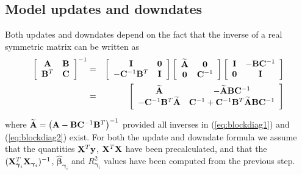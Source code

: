 \documentclass[12pt]{article}
\def\vectorfontone{\bf}
\def\vectorfonttwo{\boldsymbol}
\def\vy{{\vectorfontone y}}                      %
\def\vzero{{\vectorfontone 0}}
\def\vbeta{{\vectorfonttwo \beta}}               %
\def\vgamma{{\vectorfonttwo \gamma}}             %
\def\matrixfontone{\bf}
\def\mA{{\matrixfontone A}}                      %
\def\mB{{\matrixfontone B}}                      %
\def\mC{{\matrixfontone C}}                      %
\def\mI{{\matrixfontone I}}                      %
\def\mX{{\matrixfontone X}}                      %
\def\ds{\displaystyle}
\begin{document}
\subsection{Model updates and downdates} 

Both updates and downdates depend on the fact that
the inverse of a real symmetric matrix can be written as
\begin{eqnarray}
	\ds \left[ \begin{array}{cc}
		\mA   & \mB \\
		\mB^T & \mC
	\end{array} \right]^{-1}
	&  = &
	\ds \left[ \begin{array}{cc}
		\mI & \vzero \\
		-\mC^{-1}\mB^T &  \mI
	\end{array} \right]
	\left[ \begin{array}{cc}
		\widetilde{\mA} & \vzero \\
		\vzero & \mC^{-1}
	\end{array} \right]
	\left[ \begin{array}{cc}
		\mI    & -\mB\mC^{-1}\\
		\vzero & \mI
	\end{array} \right] \label{eq:blockdiag1}\\
	&  = &
	\ds\left[
	\begin{array}{cc}
		\widetilde{\mA}
		& - \widetilde{\mA}\mB\mC^{-1} \\
		-\mC^{-1}\mB^T\widetilde{\mA}
		& \mC^{-1} + \mC^{-1}\mB^T\widetilde{\mA}\mB\mC^{-1}
	\end{array}\right]\label{eq:blockdiag2}
\end{eqnarray}

\noindent where $\widetilde{\mA} = \left(\mA-\mB\mC^{-1}\mB^T\right)^{-1}$
provided all inverses in (\ref{eq:blockdiag1}) and
(\ref{eq:blockdiag2}) exist. 
For both the update and downdate formula we assume that the quantities
$\mX^T\vy$, $\mX^T\mX$ have been precalculated, and that the $(\mX_{\vgamma_i}^T\mX_{\vgamma_i})^{-1}$, 
$\widehat{\vbeta}_{\vgamma_i}$ and $R_{\vgamma_i}^2$ values have been computed from the previous step.
\end{document}
